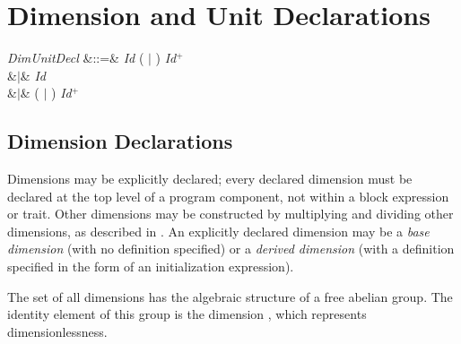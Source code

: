 %
%
%
%

\chapter{Dimension and Unit Declarations}


\begin{Grammar}
\emph{DimUnitDecl}
&::=&
 \emph{Id} 
( $|$ ) \emph{Id}$^+$
\\
&$|$&
 \emph{Id}
 \\
&$|$&
( $|$ )
\emph{Id}$^+$ 
 \\
\end{Grammar}

\section{Dimension Declarations}
Dimensions may be explicitly declared;
every declared dimension must be declared at the top level
of a program component,
not within a block expression or trait.
Other dimensions may be constructed by multiplying and dividing other dimensions,
as described in .
An explicitly declared dimension may be a \emph{base dimension} (with no definition specified)
or a \emph{derived dimension} (with a definition specified in the form of an initialization expression).

The set of all dimensions has the algebraic structure of a free abelian group.
The identity element of this group is the dimension , which represents dimensionlessness.

